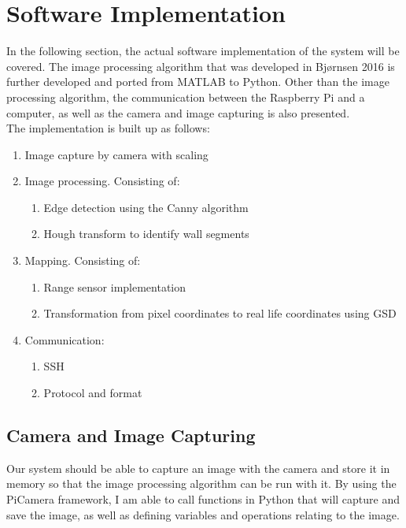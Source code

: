 \section{Software Implementation}
In the following section, the actual software implementation of the system will be covered. The image processing algorithm that was developed in Bjørnsen 2016\cite{kris} is further developed and ported from MATLAB to Python. Other than the image processing algorithm, the communication between the Raspberry Pi and a computer, as well as the camera and image capturing is also presented. \\

The implementation is built up as follows:
\begin{enumerate}
\item Image capture by camera with scaling
\item Image processing. Consisting of:
\begin{enumerate}
\item Edge detection using the Canny algorithm
\item Hough transform to identify wall segments
\end{enumerate}
\item Mapping. Consisting of:
\begin{enumerate}
\item Range sensor implementation
\item Transformation from pixel coordinates to real life coordinates using GSD
\end{enumerate}
\item Communication:
\begin{enumerate}
\item SSH
\item Protocol and format
\end{enumerate}
\end{enumerate}


\subsection{Camera and Image Capturing}
Our system should be able to capture an image with the camera and store it in memory so that the image processing algorithm can be run with it. By using the PiCamera\cite{picam} framework, I am able to call functions in Python that will capture and save the image, as well as defining variables and operations relating to the image.\\

